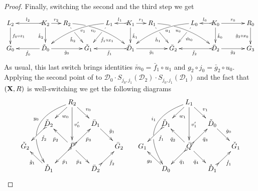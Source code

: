 \documentclass[a4paper,UKenglish,cleveref,pdftex,thm-restate,numberwithinsect]{lipics-v2021}
\def\R{\mathsf{R}}
\def\X{\textbf {\textup{X}}}
\def\G{\textbf {\textup{G}}}
\newcommand{\dder}[1]{\mathscr{#1}}
\begin{document}
\begin{proof}
	
	Finally, switching the second and the third step we get
	\[\xymatrix@C=15pt{L_2\ar[d]^{f_0\circ z_1}&& K_2 \ar[d]_{\mathring{k}_2}\ar@{>->}[ll]_{l_2} \ar[r]^{r_2} & R_2 \ar@/^.35cm/[drrr]_(.4){v_0}|(.29)\hole \ar[dr]|(.28)\hole_{\mathring{h}_2} && L_1 \ar@/_.35cm/[dlll]^(.4){v_1} \ar[dl]|(.28)\hole^{\mathring{f}_1 \circ x_1}& K_1 \ar[d]^{\mathring{k}_1}\ar@{>->}[l]_{l_1} \ar[r]^{r_1} & R_1 \ar@/^.35cm/[drrr]_(.4){u_0}|(.29)\hole\ar[dr]_{\check{h}_1}|(.28)\hole   && L_0 \ar@/_.35cm/[dlll]^(.4){u_1} \ar[dl]^{\mathring{m}_0}|(.28)\hole& K_0 \ar[d]^{\mathring{k}_0}\ar@{>->}[l]_{l_0} \ar[rr]^{r_0} && R_0\ar[d]_{\check{g}_2\circ x_0} \\G_0 && \ar[ll]^{\check{f}_0} \check{D}_0 \ar[rr]_{\check{g}_0}&& \check{G}_1  && \ar@{>->}[ll]^{\bar{f}_1} \bar{D}_1 \ar[rr]_{\bar{g}_1}&& \bar{G}_2 && \ar@{>->}[ll]^{\bar{f}_2} \bar{D}_2 \ar[rr]_{\bar{g}_2}&& G_3 }\]
	As usual, this last switch brings identities $\check{m}_0=\bar{f}_1\circ u_1$ and $g_2\circ j_0=\bar{g}_2\circ u_0$. Applying the second point of  to $\dder{D}_0\cdot S_{j_0, j_1}(\dder{D}_2)\cdot S_{j_0, j_1}(\dder{D}_1)$ and the fact that $(\X, \R)$ is well-switching we get the following diagrams
	\[\xymatrix@R=15pt@C=15pt{&&R_2 \ar@/_1.2cm/[dddl]_(.4){y_0}|(.63)\hole\ar[dl]^{w_0}\ar[dd]^{v'_0} \ar@{>}[dr]^{v_0}&&&&&L_1 \ar[dl]^{w_1} \ar@/_1.2cm/[dddl]_(.4){i_1}|(.63)\hole\ar[dd]^{v'_1} \ar@{>}[dr]^{v_1}\\&\check{D}_2 \ar@{>->}[dl]^(.4){\check{f}_2}&&\bar{D}_1 \ar[dr]^{\bar{g}_1}  &&&\check{D}_1 \ar@{>->}[dl]^(.4){\check{f}_1}&&\check{D}_0 \ar[dr]^{\check{g}_0}\\\check{G}_2 && \bar{P}\ar[dr]_{\bar{p}_4} \ar@{>->}[ur]_{\bar{p}_3}\ar@{>->}[dl]^{\bar{p}_1} \ar[ul]^{\bar{p}_2}&&\bar{G}_2&G_1 && \bar{Q}\ar[dr]_{\bar{q}_4} \ar@{>->}[ur]_{\bar{q}_3}\ar@{>->}[dl]^{\bar{q}_1} \ar[ul]^{\bar{q}_2}&&\check{G}_1\\& \mathring{D}_1 \ar[ul]^{\mathring{g}_1}&&\bar{D}_2 \ar@{>->}[ur]_{\bar{f}_2}&&& D_0 \ar[ul]^{g_0}&&\mathring{D}_1 \ar@{>->}[ur]_{\mathring{f}_1}}\]
	

\end{proof}
\end{document}
